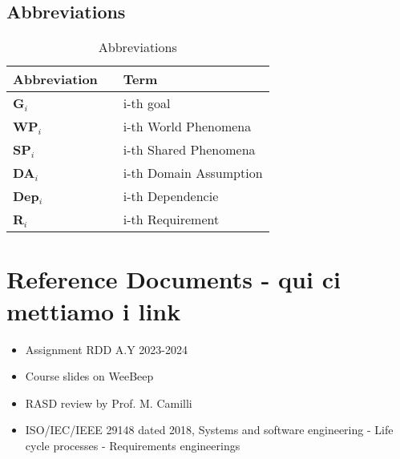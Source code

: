 \subsection{Abbreviations}
\begin{table}[H]
    \centering
    \renewcommand{\arraystretch}{1.5}
    \begin{tabular}{l l p{10.5cm}}
        \hline
        \textbf{Abbreviation} &  & \textbf{Term}          \\
        \hline
        \textbf{G}\(_i\)      &  & i-th goal              \\
        \textbf{WP}\(_i\)     &  & i-th World Phenomena   \\
        \textbf{SP}\(_i\)     &  & i-th Shared Phenomena  \\
        \textbf{DA}\(_i\)     &  & i-th Domain Assumption \\
        \textbf{Dep}\(_i\)    &  & i-th Dependencie       \\
        \textbf{R}\(_i\)      &  & i-th Requirement       \\
        \hline
    \end{tabular}
    \caption{Abbreviations}
\end{table}

{\color{red}\section{Reference Documents - qui ci mettiamo i link}}
\begin{itemize}
    \item Assignment RDD A.Y 2023-2024
    \item Course slides on WeeBeep
    \item RASD review by Prof. M. Camilli
    \item ISO/IEC/IEEE 29148 dated 2018, Systems and software engineering - Life cycle processes - Requirements engineerings
\end{itemize}

